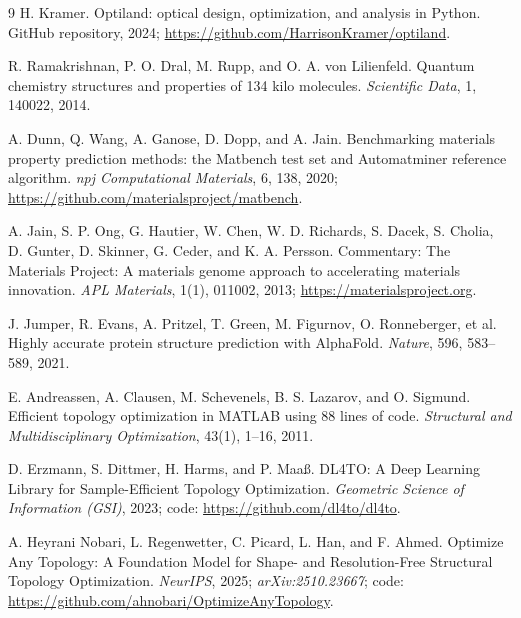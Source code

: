 \documentclass[11pt]{article}
\begin{document}
\begin{thebibliography}{9}
H. Kramer.
\newblock Optiland: optical design, optimization, and analysis in Python.
\newblock GitHub repository, 2024; \url{https://github.com/HarrisonKramer/optiland}.

R. Ramakrishnan, P. O. Dral, M. Rupp, and O. A. von Lilienfeld.
\newblock Quantum chemistry structures and properties of 134 kilo molecules.
\newblock \emph{Scientific Data}, 1, 140022, 2014.

A. Dunn, Q. Wang, A. Ganose, D. Dopp, and A. Jain.
\newblock Benchmarking materials property prediction methods: the Matbench test set and Automatminer reference algorithm.
\newblock \emph{npj Computational Materials}, 6, 138, 2020; \url{https://github.com/materialsproject/matbench}.

A. Jain, S. P. Ong, G. Hautier, W. Chen, W. D. Richards, S. Dacek, S. Cholia, D. Gunter, D. Skinner, G. Ceder, and K. A. Persson.
\newblock Commentary: The Materials Project: A materials genome approach to accelerating materials innovation.
\newblock \emph{APL Materials}, 1(1), 011002, 2013; \url{https://materialsproject.org}.

J. Jumper, R. Evans, A. Pritzel, T. Green, M. Figurnov, O. Ronneberger, et al.
\newblock Highly accurate protein structure prediction with AlphaFold.
\newblock \emph{Nature}, 596, 583--589, 2021.

E. Andreassen, A. Clausen, M. Schevenels, B. S. Lazarov, and O. Sigmund.
\newblock Efficient topology optimization in MATLAB using 88 lines of code.
\newblock \emph{Structural and Multidisciplinary Optimization}, 43(1), 1--16, 2011.

D. Erzmann, S. Dittmer, H. Harms, and P. Maa\ss.
\newblock DL4TO: A Deep Learning Library for Sample-Efficient Topology Optimization.
\newblock \emph{Geometric Science of Information (GSI)}, 2023; code: \url{https://github.com/dl4to/dl4to}.

A. Heyrani Nobari, L. Regenwetter, C. Picard, L. Han, and F. Ahmed.
\newblock Optimize Any Topology: A Foundation Model for Shape- and Resolution-Free Structural Topology Optimization.
\newblock \emph{NeurIPS}, 2025; \emph{arXiv:2510.23667}; code: \url{https://github.com/ahnobari/OptimizeAnyTopology}.


\end{thebibliography}
\end{document}
